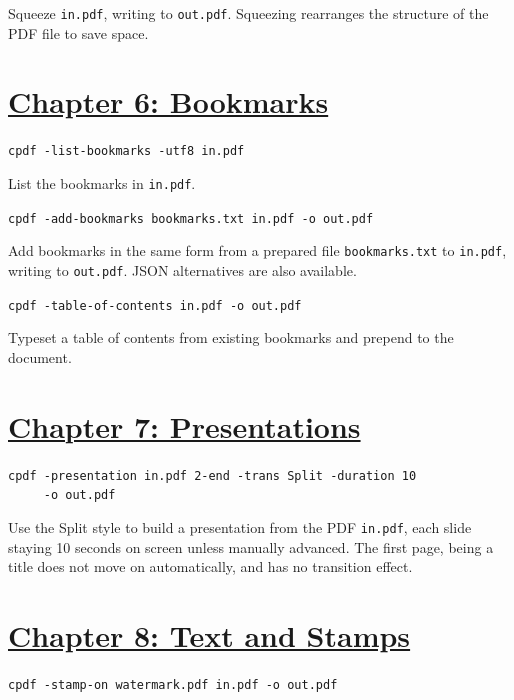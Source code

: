 \documentclass{book}
\begin{document}
\noindent Squeeze \texttt{in.pdf}, writing to \texttt{out.pdf}. Squeezing rearranges the structure of the PDF file to save space.


\section*{\hyperref[chap:6]{Chapter 6: Bookmarks}}

\begin{framed}\noindent\texttt{cpdf -list-bookmarks -utf8 in.pdf}\end{framed}

\noindent List the bookmarks in \texttt{in.pdf}. 

\begin{framed}\noindent\texttt{cpdf -add-bookmarks bookmarks.txt in.pdf -o out.pdf}\end{framed}

\noindent Add bookmarks in the same form from a prepared file \texttt{bookmarks.txt} to \texttt{in.pdf}, writing to \texttt{out.pdf}. JSON alternatives are also available.

\begin{framed}\noindent\texttt{cpdf -table-of-contents in.pdf -o out.pdf}\end{framed}

\noindent Typeset a table of contents from existing bookmarks and prepend to the document.

\section*{\hyperref[chap:7]{Chapter 7: Presentations}}

\begin{framed}
 \noindent\small\verb?cpdf -presentation in.pdf 2-end -trans Split -duration 10?\\
 \noindent\small\verb?     -o out.pdf?
\end{framed}

\noindent Use the Split style to build a presentation from the PDF \texttt{in.pdf}, each slide staying 10 seconds on screen unless manually advanced. The first page, being a title does not move on automatically, and has no transition effect.

\section*{\hyperref[chap:8]{Chapter 8: Text and Stamps}}

\begin{framed}\noindent\texttt{cpdf -stamp-on watermark.pdf in.pdf -o out.pdf}\end{framed}
\end{document}
